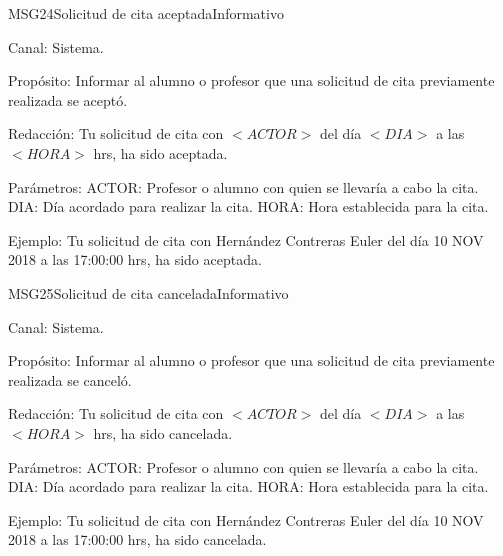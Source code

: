 \begin{mensaje}{MSG24}{Solicitud de cita aceptada}{Informativo}
	\item[Canal:] Sistema.
    \item[Propósito:] Informar al alumno o profesor que una solicitud de cita previamente realizada se aceptó. 
    \item[Redacción:] Tu solicitud de cita con $<ACTOR>$ del día $<DIA>$ a las $<HORA>$ hrs, ha sido aceptada. 
    \item[Parámetros:] ACTOR: Profesor o alumno con quien se llevaría a cabo la cita. DIA: Día acordado para realizar la cita. HORA: Hora establecida para la cita.
    \item[Ejemplo:] Tu solicitud de cita con Hernández Contreras Euler del día 10 NOV 2018 a las 17:00:00 hrs, ha sido aceptada. 
\end{mensaje}

\begin{mensaje}{MSG25}{Solicitud de cita cancelada}{Informativo}
	\item[Canal:] Sistema.
    \item[Propósito:] Informar al alumno o profesor que una solicitud de cita previamente realizada se canceló. 
    \item[Redacción:] Tu solicitud de cita con $<ACTOR>$ del día $<DIA>$ a las $<HORA>$ hrs, ha sido cancelada. 
    \item[Parámetros:] ACTOR: Profesor o alumno con quien se llevaría a cabo la cita. DIA: Día acordado para realizar la cita. HORA: Hora establecida para la cita.
    \item[Ejemplo:] Tu solicitud de cita con Hernández Contreras Euler del día 10 NOV 2018 a las 17:00:00 hrs, ha sido cancelada. 
\end{mensaje}


